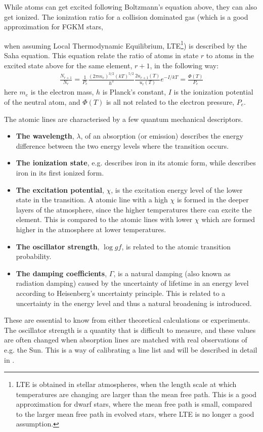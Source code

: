 While atoms can get excited following Boltzmann's equation above, they can also get ionized. The
ionization ratio for a collision dominated gas (which is a good approximation for FGKM stars, {when
assuming Local Thermodynamic Equilibrium, LTE\footnote{LTE is obtained in stellar atmospheres, when
the length scale at which temperatures are changing are larger than the mean free path. This is a
good approximation for dwarf stars, where the mean free path is small, compared to the larger mean
free path in evolved stars, where LTE is no longer a good assumption.}) is described by the Saha
equation. This equation relate the ratio of atoms in state $r$ to atoms in the excited state above
for the same element, $r+1$, in the following way:
\begin{align}
  \frac{N_{r+1}}{N_r} = \frac{1}{P_e} \frac{(2\pi m_e)^{3/2}(kT)^{5/2}}{h^3} \frac{2u_{r+1}(T)}{u_r(T)} e^{-I/kT} = \frac{\Phi(T)}{P_e} \tag*{Saha}\label{eq:saha}
\end{align}
here $m_e$ is the electron mass, $h$ is Planck's constant, $I$ is the ionization potential of the
neutral atom, and $\Phi(T)$ is all not related to the electron pressure, $P_e$.

The atomic lines are characterised by a few quantum mechanical descriptors.
\begin{itemize}
  \item \textbf{The wavelength}, $\lambda$, of an absorption (or emission) describes the energy
        difference between the two energy levels where the transition occurs.
  \item \textbf{The ionization state}, e.g.  describes iron in its atomic form, while
         describes iron in its first ionized form.
  \item \textbf{The excitation potential}, $\chi$, is the excitation energy level of the lower
        state in the transition. A atomic line with a high $\chi$ is formed in the deeper layers of
        the atmosphere, since the higher temperatures there can excite the element. This is compared
        to the atomic lines with lower $\chi$ which are formed higher in the atmosphere at lower
        temperatures.
  \item \textbf{The oscillator strength}, $\log \mathit{gf}$, is related to the atomic transition
        probability.
  \item \textbf{The damping coefficients}, $\Gamma$, is a natural damping (also known as radiation
        damping) caused by the uncertainty of lifetime in an energy level according to Heisenberg's
        uncertainty principle. This is related to a uncertainty in the energy level and thus a
        natural broadening is introduced.
\end{itemize}
These are essential to know from either theoretical calculations or experiments. The oscillator
strength is a quantity that is difficult to measure, and these values are often changed when
absorption lines are matched with real observations of e.g. the Sun. This is a way of calibrating a
line list and will be described in detail in .

}
